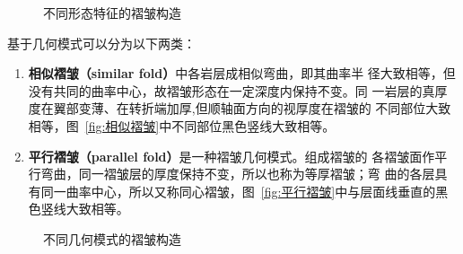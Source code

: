 \documentclass[a4paper,twoside]{ctexart}
\begin{document}
 \begin{figure}[htbp]
  \centering
  \hspace{2cm}
  
  \caption{不同形态特征的褶皱构造}
  \label{fig:不同形态特征的褶皱构造}
\end{figure}

基于几何模式可以分为以下两类：
\begin{enumerate}
\item \textbf{相似褶皱（similar fold）}中各岩层成相似弯曲，即其曲率半
  径大致相等，但没有共同的曲率中心，故褶皱形态在一定深度内保持不变。同
  一岩层的真厚度在翼部变薄、在转折端加厚,但顺轴面方向的视厚度在褶皱的
  不同部位大致相等，图~\ref{fig:相似褶皱}中不同部位黑色竖线大致相等。
\item \textbf{平行褶皱（parallel fold）}是一种褶皱几何模式。组成褶皱的
  各褶皱面作平行弯曲，同一褶皱层的厚度保持不变，所以也称为等厚褶皱；弯
  曲的各层具有同一曲率中心，所以又称同心褶皱，图~\ref{fig:平行褶皱}中与层面线垂直的黑色竖线大致相等。 
\end{enumerate}

 \begin{figure}[htbp]
  \centering
  \hspace{2cm}
  
  \caption{不同几何模式的褶皱构造}
  \label{fig:不同几何模式的褶皱构造}
\end{figure}
\end{document}
